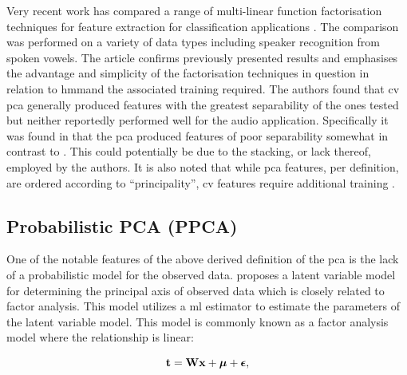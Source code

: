 Very recent work has compared a range of multi-linear function factorisation techniques for feature extraction for classification applications \cite{Burke2013}. The comparison was performed on a variety of data types including speaker recognition from spoken vowels. The article confirms previously presented results and emphasises the advantage and simplicity of the factorisation techniques in question in relation to \DIFdelbegin {}\DIFdelend \DIFaddbegin \gls{hmm}\DIFaddend and the associated training required. The authors found that \DIFdelbegin {}\DIFdelend \DIFaddbegin \gls{cv} \gls{pca} \DIFaddend generally produced features with the greatest separability of the ones tested but neither reportedly performed well for the audio application. Specifically it was found in \cite{Burke2013} that the \DIFdelbegin {}\DIFdelend \DIFaddbegin \gls{pca} \DIFaddend produced features of poor separability somewhat in contrast to \cite{Raychaudhuri2000}. This could potentially be due to the stacking, or lack thereof, employed by the authors. It is also noted that while \DIFdelbegin {}\DIFdelend \DIFaddbegin \gls{pca} \DIFaddend features, per definition, are ordered according to ``principality'', \DIFdelbegin {}\DIFdelend \DIFaddbegin \gls{cv} \DIFaddend features require additional training \cite{Burke2013}.

\subsection{Probabilistic PCA (PPCA)}
One of the notable features of the above derived definition of the \DIFdelbegin {}\DIFdelend \DIFaddbegin \gls{pca} \DIFaddend is the lack of a probabilistic model for the observed data. \cite{Tipping1999} proposes a latent variable model for determining the principal axis of observed data which is closely related to factor analysis. This model utilizes a \DIFdelbegin {}\DIFdelend \DIFaddbegin \gls{ml} \DIFaddend estimator to estimate the parameters of the latent variable model. This model is commonly known as a factor analysis model where the relationship is linear:

\begin{equation}\label{eq:facAn}
\textrm{\textbf{t}} = \textrm{\textbf{W}}\textrm{\textbf{x}} + \boldsymbol\mu + \boldsymbol\epsilon,
\end{equation}

